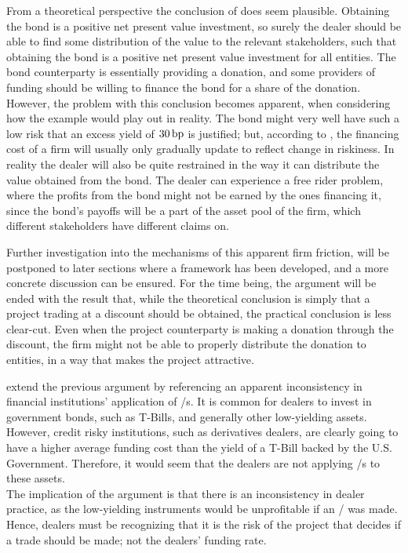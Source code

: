 \documentclass[main.tex]{subfiles}
\begin{document}
            From a theoretical perspective the conclusion of \textcite{HullWhite2012FVA} does seem plausible. 
            Obtaining the bond is a positive net present value investment, 
            so surely the dealer should be able to find some distribution of the value to the relevant stakeholders, 
            such that obtaining the bond is a positive net present value investment for all entities.
            The bond counterparty is essentially providing a donation, 
            and some providers of funding should be willing to finance the bond for a share of the donation.
            However, the problem with this conclusion becomes apparent,
            when considering how the example would play out in reality. 
            The bond might very well have such a low risk that an excess yield of $30\,\text{bp}$ is justified;
            but, according to \textcite{Castagna2012FVA}, 
            the financing cost of a firm will usually only gradually update to reflect change in riskiness.
            In reality the dealer will also be quite restrained 
            in the way it can distribute the value obtained from the bond.
            The dealer can experience a free rider problem, 
            where the profits from the bond might not be earned by the ones financing it,
            since the bond's payoffs will be a part of the asset pool of the firm,
            which different stakeholders have different claims on.

            Further investigation into the mechanisms of this apparent firm friction,
            will be postponed to later sections where a framework has been developed,
            and a more concrete discussion can be ensured.  
            For the time being, the argument will be ended with the result that, 
            while the theoretical conclusion is simply that a project trading at a discount should be obtained,
            the practical conclusion is less clear-cut.
            Even when the project counterparty is making a donation through the discount,
            the firm might not be able to properly distribute the donation to entities,
            in a way that makes the project attractive.

            \textcite{HullWhite2012FVA} extend the previous argument by referencing 
            an apparent inconsistency in financial institutions' application of \FVA/s.
            It is common for dealers to invest in government bonds, such as T-Bills,
            and generally other low-yielding assets.
            However, credit risky institutions, such as derivatives dealers, are clearly going to have
            a higher average funding cost than the yield of a T-Bill backed by the U.S. Government.
            Therefore, it would seem that the dealers are not applying \FVA/s to these assets.
            \\
            The implication of the argument is that there is an inconsistency in dealer practice,
            as the low-yielding instruments would be unprofitable if an \FVA/ was made.
            Hence, dealers must be recognizing that it is 
            the risk of the project that decides if a trade should be made; 
            not the dealers' funding rate.
\end{document}

